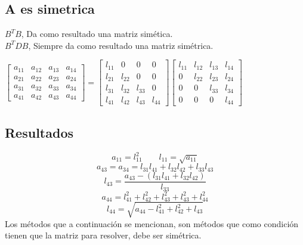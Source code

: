 \subsection*{A es simetrica}
$B^TB$, Da como resultado una matriz sim\'etica. \\
$B^TDB$, Siempre da como resultado una matriz sim\'etrica.
\begin{center}
$\begin{bmatrix}
a_{11} & a_{12} & a_{13} & a_{14} \\
a_{21} & a_{22} & a_{23} & a_{24} \\
a_{31} & a_{32} & a_{33} & a_{34} \\
a_{41} & a_{42} & a_{43} & a_{44} 
\end{bmatrix}=\begin{bmatrix}
l_{11} & 0 & 0 & 0 \\
l_{21} & l_{22} & 0 & 0 \\
l_{31} & l_{32} & l_{33} & 0 \\
l_{41} & l_{42} & l_{43} & l_{44} 
\end{bmatrix}\begin{bmatrix}
l_{11} & l_{12} & l_{13} & l_{14} \\
0 & l_{22} & l_{23} & l_{24} \\
0 & 0 & l_{33} & l_{34} \\
0 & 0 & 0 & l_{44} 
\end{bmatrix} $
\end{center}
\subsection*{Resultados}
\begin{displaymath}a_{11}=l_{11}^2 \qquad l_{11}=\sqrt{a_{11}}\end{displaymath}
\begin{displaymath}a_{43}=a_{34}=l_{31}l_{41}+l_{32}l_{42}+l_{33}l_{43}\end{displaymath}
\begin{displaymath}l_{43}=\frac{a_{43}-(l_{31}l_{41}+l_{32}l_{42})}{l_{33}}\end{displaymath}
\begin{displaymath}a_{44}=l_{41}^2+l_{42}^2+l_{43}^2+l_{43}^2+l_{44}^2\end{displaymath}
\begin{displaymath}l_{44}=\sqrt{a_{44}-l_{41}^2+l_{42}^2+l_{43}}\end{displaymath}
Los m\'etodos que a continuaci\'on se mencionan, son m\'etodos que como condici\'on tienen que la matriz para resolver, debe ser sim\'etrica.

